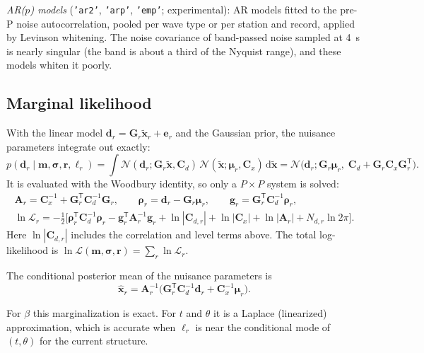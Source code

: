 \documentclass[11pt]{article}
\newcommand{\dd}{\mathrm{d}}
\newcommand{\T}{\mathsf{T}}
\begin{document}
\emph{AR($p$) models} (\texttt{'ar2'}, \texttt{'arp'}, \texttt{'emp'};
experimental): AR models fitted to the pre-P noise autocorrelation, pooled
per wave type or per station and record, applied by Levinson whitening. The
noise covariance of band-passed noise sampled at 4~s is nearly singular
(the band is about a third of the Nyquist range), and these models whiten
it poorly.

\subsection{Marginal likelihood}
With the linear model $\mathbf{d}_r=\mathbf{G}_r\tilde{\mathbf{x}}_r+\mathbf{e}_r$
and the Gaussian prior, the nuisance parameters integrate out exactly:
\begin{equation}
 p(\mathbf{d}_r\mid\mathbf{m},\bm\sigma,\mathbf{r},\bm\ell_r)=\int\mathcal{N}(\mathbf{d}_r;\mathbf{G}_r\tilde{\mathbf{x}},\mathbf{C}_d)\,\mathcal{N}(\tilde{\mathbf{x}};\bm\mu_r,\mathbf{C}_x)\,\dd\tilde{\mathbf{x}}
 =\mathcal{N}\big(\mathbf{d}_r;\mathbf{G}_r\bm\mu_r,\;\mathbf{C}_d+\mathbf{G}_r\mathbf{C}_x\mathbf{G}_r^\T\big).
\end{equation}
It is evaluated with the Woodbury identity, so only a $P\times P$ system
is solved:
\begin{gather}
 \mathbf{A}_r=\mathbf{C}_x^{-1}+\mathbf{G}_r^\T\mathbf{C}_d^{-1}\mathbf{G}_r,\qquad
 \bm\rho_r=\mathbf{d}_r-\mathbf{G}_r\bm\mu_r,\qquad
 \mathbf{g}_r=\mathbf{G}_r^\T\mathbf{C}_d^{-1}\bm\rho_r,\\
 \ln\mathcal{L}_r=-\tfrac12\Big[\bm\rho_r^\T\mathbf{C}_d^{-1}\bm\rho_r-\mathbf{g}_r^\T\mathbf{A}_r^{-1}\mathbf{g}_r
 +\ln|\mathbf{C}_{d,r}|+\ln|\mathbf{C}_x|+\ln|\mathbf{A}_r|+N_{d,r}\ln2\pi\Big].\label{eq:logL}
\end{gather}
Here $\ln|\mathbf{C}_{d,r}|$ includes the correlation and level terms above. The total
log-likelihood is $\ln\mathcal{L}(\mathbf{m},\bm\sigma,\mathbf{r})=\sum_r\ln\mathcal{L}_r$.

The conditional posterior mean of the nuisance parameters is
\begin{equation}\label{eq:xhat}
 \hat{\mathbf{x}}_r=\mathbf{A}_r^{-1}\big(\mathbf{G}_r^\T\mathbf{C}_d^{-1}\mathbf{d}_r+\mathbf{C}_x^{-1}\bm\mu_r\big).
\end{equation}

For $\beta$ this marginalization is exact. For $t$ and $\theta$ it is a
Laplace (linearized) approximation, which is accurate when $\bm\ell_r$ is
near the conditional mode of $(t,\theta)$ for the current structure.
\end{document}
